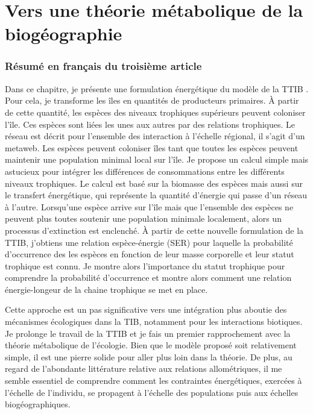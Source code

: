 \chapter{Vers une théorie métabolique de la biogéographie}
\label{chap4}


\subsection{Résumé en français du troisième article}

Dans ce chapitre, je présente une formulation énergétique du modèle
de la TTIB \citep{Gravel2011}. Pour cela, je transforme les îles en
quantités de producteurs primaires. À partir de cette quantité,
les espèces des niveaux trophiques supérieurs peuvent coloniser l'île.
Ces espèces sont liées les unes aux autres par des relations trophiques.
Le réseau est décrit pour l'ensemble des interaction à l'échelle régional,
il s'agit d'un metaweb. Les espèces peuvent coloniser îles tant que toutes les
espèces peuvent maintenir une population minimal local sur l'île.
Je propose un calcul simple mais astucieux pour intégrer les différences
de consommations entre les différents niveaux trophiques. Le calcul est
basé sur la biomasse des espèces mais aussi sur le transfert énergétique,
qui représente la quantité d'énergie qui passe d'un réseau à l'autre.
Lorsqu'une espèce arrive sur l'île mais que l'ensemble des espèces ne peuvent
plus toutes soutenir une population minimale localement, alors un processus
d'extinction est enclenché. À partir de cette nouvelle formulation de la
TTIB, j'obtiens une relation espèce-énergie (SER) pour laquelle la probabilité
d'occurrence des les espèces en fonction de leur masse corporelle et
leur statut trophique est connu. Je montre alors l'importance du statut trophique
pour comprendre la probabilité d'occurrence et montre alors comment une relation
énergie-longeur de la chaine trophique se met en place.

Cette approche est un pas significative vers une intégration plus aboutie des
mécanismes écologiques dans la TIB, notamment pour les
interactions biotiques. Je prolonge le travail de la TTIB et
je fais un premier rapprochement avec la théorie métabolique de l'écologie.
Bien que le modèle proposé soit relativement simple, il est une pierre solide pour
aller plus loin dans la théorie. De plus, au regard de l'abondante littérature
relative aux relations allométriques, il me semble essentiel de comprendre
comment les contraintes énergétiques, exercées à l'échelle de l'individu,
se propagent à l’échelle des populations puis aux échelles biogéographiques.



